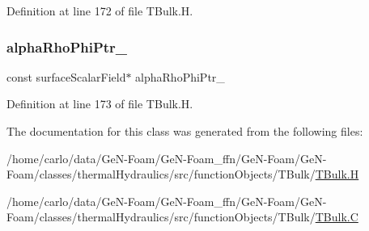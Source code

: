 Definition at line 172 of file T\+Bulk.\+H.

\mbox{\label{classFoam_1_1functionObjects_1_1TBulk_a5f2ba6527b700c57790b8d0997b21159}} 
\subsubsection{\texorpdfstring{alpha\+Rho\+Phi\+Ptr\+\_\+}{alphaRhoPhiPtr\_}}
{\footnotesize\ttfamily const surface\+Scalar\+Field$\ast$ alpha\+Rho\+Phi\+Ptr\+\_\+\hspace{0.3cm}{\ttfamily [protected]}}



Definition at line 173 of file T\+Bulk.\+H.



The documentation for this class was generated from the following files\+:\begin{DoxyCompactItemize}
\item 
/home/carlo/data/\+Ge\+N-\/\+Foam/\+Ge\+N-\/\+Foam\+\_\+ffn/\+Ge\+N-\/\+Foam/\+Ge\+N-\/\+Foam/classes/thermal\+Hydraulics/src/function\+Objects/\+T\+Bulk/\hyperlink{TBulk_8H}{T\+Bulk.\+H}\item 
/home/carlo/data/\+Ge\+N-\/\+Foam/\+Ge\+N-\/\+Foam\+\_\+ffn/\+Ge\+N-\/\+Foam/\+Ge\+N-\/\+Foam/classes/thermal\+Hydraulics/src/function\+Objects/\+T\+Bulk/\hyperlink{TBulk_8C}{T\+Bulk.\+C}\end{DoxyCompactItemize}
